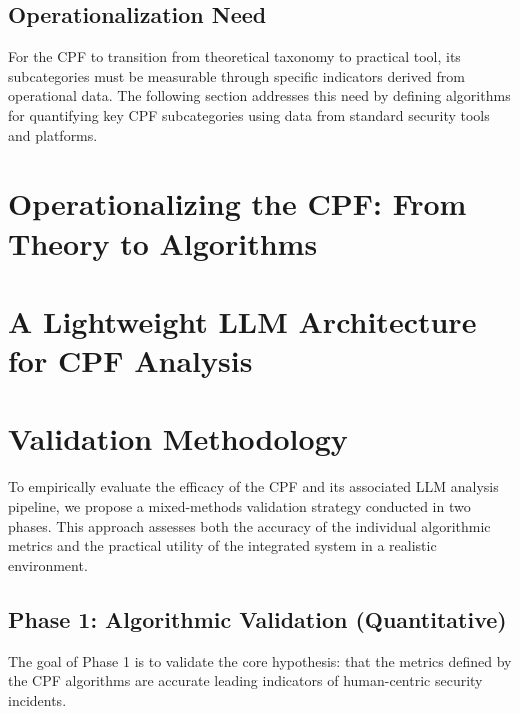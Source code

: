 \documentclass[11pt, a4paper]{article}
\begin{document}
\subsection{Operationalization Need}
For the CPF to transition from theoretical taxonomy to practical tool, its subcategories must be measurable through specific indicators derived from operational data. The following section addresses this need by defining algorithms for quantifying key CPF subcategories using data from standard security tools and platforms.

\section{Operationalizing the CPF: From Theory to Algorithms}
\label{sec:operationalization}


\section{A Lightweight LLM Architecture for CPF Analysis}
\label{sec:llm_architecture}


\section{Validation Methodology}
\label{sec:validation}

To empirically evaluate the efficacy of the CPF and its associated LLM analysis pipeline, we propose a mixed-methods validation strategy conducted in two phases. This approach assesses both the accuracy of the individual algorithmic metrics and the practical utility of the integrated system in a realistic environment.

\subsection{Phase 1: Algorithmic Validation (Quantitative)}
The goal of Phase 1 is to validate the core hypothesis: that the metrics defined by the CPF algorithms are accurate leading indicators of human-centric security incidents.
\end{document}
